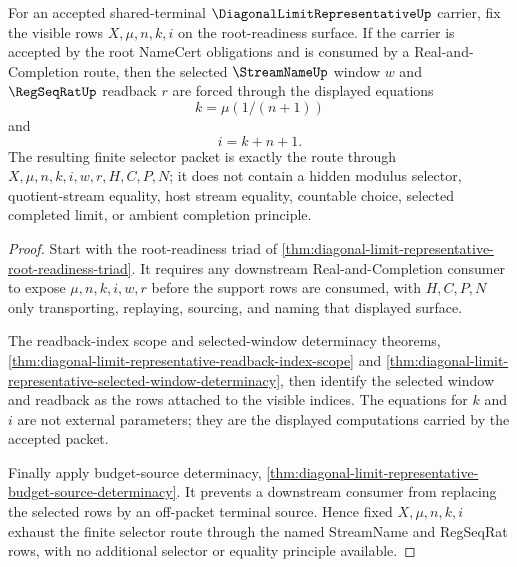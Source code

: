 \begin{theorem}
\label{thm:diagonal-limit-representative-finite-selector-exhaustion}
For an accepted shared-terminal $\DiagonalLimitRepresentativeUp$ carrier, fix the visible rows $X,\mu,n,k,i$ on the root-readiness surface. If the carrier is accepted by the root NameCert obligations and is consumed by a Real-and-Completion route, then the selected $\StreamNameUp$ window $w$ and $\RegSeqRatUp$ readback $r$ are forced through the displayed equations
$$
k=\mu(1/(n+1))
$$
and
$$
i=k+n+1.
$$
The resulting finite selector packet is exactly the route through $X,\mu,n,k,i,w,r,H,C,P,N$; it does not contain a hidden modulus selector, quotient-stream equality, host stream equality, countable choice, selected completed limit, or ambient completion principle.
\end{theorem}
\begin{proof}
Start with the root-readiness triad of \autoref{thm:diagonal-limit-representative-root-readiness-triad}. It requires any downstream Real-and-Completion consumer to expose $\mu,n,k,i,w,r$ before the support rows are consumed, with $H,C,P,N$ only transporting, replaying, sourcing, and naming that displayed surface.

The readback-index scope and selected-window determinacy theorems, \autoref{thm:diagonal-limit-representative-readback-index-scope} and \autoref{thm:diagonal-limit-representative-selected-window-determinacy}, then identify the selected window and readback as the rows attached to the visible indices. The equations for $k$ and $i$ are not external parameters; they are the displayed computations carried by the accepted packet.

Finally apply budget-source determinacy, \autoref{thm:diagonal-limit-representative-budget-source-determinacy}. It prevents a downstream consumer from replacing the selected rows by an off-packet terminal source. Hence fixed $X,\mu,n,k,i$ exhaust the finite selector route through the named StreamName and RegSeqRat rows, with no additional selector or equality principle available.
\end{proof}

